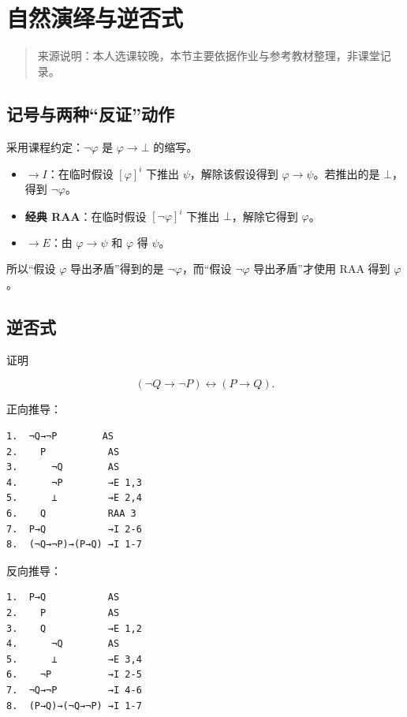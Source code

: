 \section{自然演绎与逆否式}


\begin{quote}
来源说明：本人选课较晚，本节主要依据作业与参考教材整理，非课堂记录。
\end{quote}


\subsection{记号与两种“反证”动作}


采用课程约定：$\neg\varphi$ 是 $\varphi\to\bot$ 的缩写。

\begin{itemize}
\item \textbf{$\to I$}：在临时假设 $[\varphi]^i$ 下推出 $\psi$，解除该假设得到 $\varphi\to\psi$。若推出的是 $\bot$，得到 $\neg\varphi$。
\item \textbf{经典 RAA}：在临时假设 $[\neg\varphi]^i$ 下推出 $\bot$，解除它得到 $\varphi$。
\item \textbf{$\to E$}：由 $\varphi\to\psi$ 和 $\varphi$ 得 $\psi$。
\end{itemize}


所以“假设 $\varphi$ 导出矛盾”得到的是 $\neg\varphi$，而“假设 $\neg\varphi$ 导出矛盾”才使用 RAA 得到 $\varphi$。

\subsection{逆否式}


证明

\[
(\neg Q\to\neg P)\leftrightarrow(P\to Q).
\]

正向推导：

\begin{verbatim}
1.  ¬Q→¬P        AS
2.    P           AS
3.      ¬Q        AS
4.      ¬P        →E 1,3
5.      ⊥         →E 2,4
6.    Q           RAA 3
7.  P→Q           →I 2-6
8.  (¬Q→¬P)→(P→Q) →I 1-7
\end{verbatim}


反向推导：

\begin{verbatim}
1.  P→Q           AS
2.    P           AS
3.    Q           →E 1,2
4.      ¬Q        AS
5.      ⊥         →E 3,4
6.    ¬P          →I 2-5
7.  ¬Q→¬P         →I 4-6
8.  (P→Q)→(¬Q→¬P) →I 1-7
\end{verbatim}



